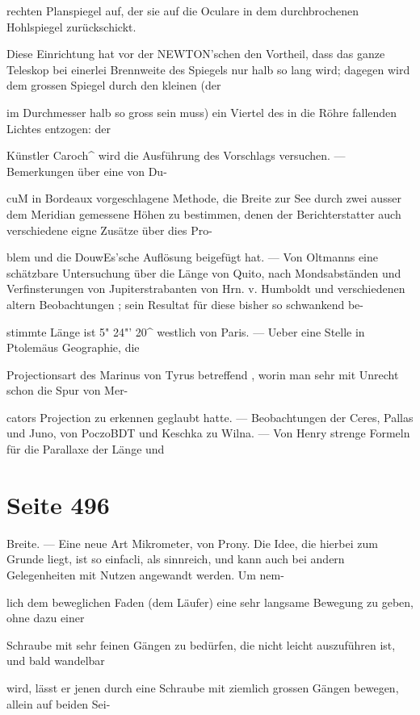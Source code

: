 \documentclass[10pt,a4paper]{article}
\begin{document}
rechten Planspiegel auf, der sie auf die Oculare in dem durchbrochenen Hohlspiegel zurückschickt.

Diese Einrichtung hat vor der NEWTON'schen den Vortheil, dass das ganze Teleskop bei einerlei Brennweite des Spiegels nur halb so lang wird; dagegen wird dem grossen Spiegel durch den kleinen (der

im Durchmesser halb so gross sein muss) ein Viertel des in die Röhre fallenden Lichtes entzogen: der

Künstler Caroch\textasciicircum{} wird die Ausführung des Vorschlags versuchen. — Bemerkungen über eine von Du-

cuM in Bordeaux vorgeschlagene Methode, die Breite zur See durch zwei ausser dem Meridian gemessene Höhen zu bestimmen, denen der Berichterstatter auch verschiedene eigne Zusätze über dies Pro-

blem und die DouwEs'sche Auflösung beigefügt hat. — Von Oltmanns eine schätzbare Untersuchung über die Länge von Quito, nach Mondsabständen und Verfinsterungen von Jupiterstrabanten von Hrn. v. Humboldt und verschiedenen altern Beobachtungen ; sein Resultat für diese bisher so schwankend be-

stimmte Länge ist 5" 24"' 20\textasciicircum{} westlich von Paris. — Ueber eine Stelle in Ptolemäus Geographie, die

Projectionsart des Marinus von Tyrus betreffend , worin man sehr mit Unrecht schon die Spur von Mer-

cators Projection zu erkennen geglaubt hatte. — Beobachtungen der Ceres, Pallas und Juno, von PoczoBDT und Keschka zu Wilna. — Von Henry strenge Formeln für die Parallaxe der Länge und


\newpage
\section*{Seite 496}
Breite. — Eine neue Art Mikrometer, von Prony. Die Idee, die hierbei zum Grunde liegt, ist so einfacli, als sinnreich, und kann auch bei andern Gelegenheiten mit Nutzen angewandt werden. Um nem-

lich dem beweglichen Faden (dem Läufer) eine sehr langsame Bewegung zu geben, ohne dazu einer

Schraube mit sehr feinen Gängen zu bedürfen, die nicht leicht auszuführen ist, und bald wandelbar

wird, lässt er jenen durch eine Schraube mit ziemlich grossen Gängen bewegen, allein auf beiden Sei-
\end{document}
